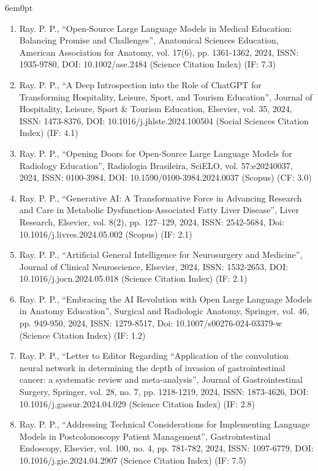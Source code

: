 \documentclass[11pt,a4paper]{moderncv}
\begin{document}
\begin{adjustwidth}{6em}{0pt}
\begin{enumerate}
		\item Ray. P. P., “Open-Source Large Language Models in Medical Education: Balancing Promise and Challenges”, Anatomical Sciences Education, American Association for Anatomy, vol. 17(6), pp. 1361-1362, 2024, ISSN: 1935-9780, DOI: 10.1002/ase.2484 (Science Citation Index) (IF: 7.3)
		
		\item Ray. P. P., “A Deep Introspection into the Role of ChatGPT for Transforming Hospitality, Leisure, Sport, and Tourism Education”, Journal of Hospitality, Leisure, Sport \& Tourism Education, Elsevier, vol. 35, 2024, ISSN: 1473-8376, DOI: 10.1016/j.jhlste.2024.100504 (Social Sciences Citation Index) (IF: 4.1)
		
		\item Ray. P. P., “Opening Doors for Open-Source Large Language Models for Radiology Education”, Radiologia Brasileira, SciELO, vol. 57:e20240037, 2024, ISSN: 0100-3984, DOI: 10.1590/0100-3984.2024.0037 (Scopus) (CF: 3.0)
		
		\item Ray. P. P., “Generative AI: A Transformative Force in Advancing Research and Care in Metabolic Dysfunction-Associated Fatty Liver Disease”, Liver Research, Elsevier, vol. 8(2), pp. 127–129, 2024, ISSN: 2542-5684, Doi: 10.1016/j.livres.2024.05.002 (Scopus) (IF: 2.1)
		
		\item Ray. P. P., “Artificial General Intelligence for Neurosurgery and Medicine”, Journal of Clinical Neuroscience, Elsevier, 2024, ISSN: 1532-2653, DOI: 10.1016/j.jocn.2024.05.018 (Science Citation Index) (IF: 2.1)
		
		\item Ray. P. P., “Embracing the AI Revolution with Open Large Language Models in Anatomy Education”, Surgical and Radiologic Anatomy, Springer, vol. 46, pp. 949-950, 2024, ISSN: 1279-8517, Doi: 10.1007/s00276-024-03379-w (Science Citation Index) (IF: 1.2)
		
		\item Ray. P. P., “Letter to Editor Regarding “Application of the convolution neural network in determining the depth of invasion of gastrointestinal cancer: a systematic review and meta-analysis”, Journal of Gastrointestinal Surgery, Springer, vol. 28, no. 7, pp. 1218-1219, 2024, ISSN: 1873-4626, DOI: 10.1016/j.gassur.2024.04.029 (Science Citation Index) (IF: 2.8)
		
		\item Ray. P. P., “Addressing Technical Considerations for Implementing Language Models in Postcolonoscopy Patient Management”, Gastrointestinal Endoscopy, Elsevier, vol. 100, no. 4, pp. 781-782, 2024, ISSN: 1097-6779, DOI: 10.1016/j.gie.2024.04.2907 (Science Citation Index) (IF: 7.5)
		

\end{enumerate}
\end{adjustwidth}
\end{document}
